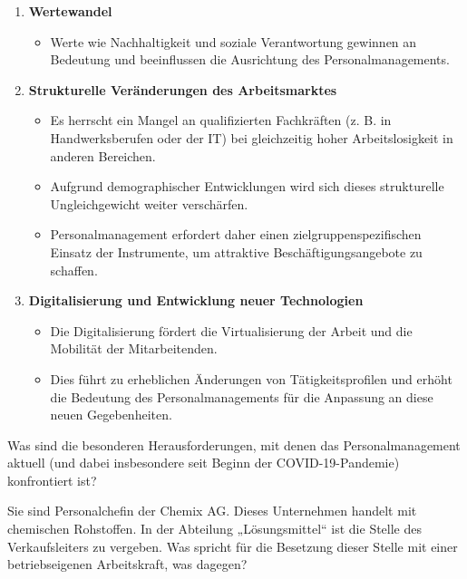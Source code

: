 {\begin{enumerate}
    \begin{itemize}
        \item Mitarbeitende legen zunehmend Wert auf individuelle Arbeitsbedingungen und maßgeschneiderte Entwicklungsmöglichkeiten.
    \end{itemize}
    \item \textbf{Wertewandel}
    \begin{itemize}
        \item Werte wie Nachhaltigkeit und soziale Verantwortung gewinnen an Bedeutung und beeinflussen die Ausrichtung des Personalmanagements.
    \end{itemize}
    \item \textbf{Strukturelle Veränderungen des Arbeitsmarktes}
    \begin{itemize}
        \item Es herrscht ein Mangel an qualifizierten Fachkräften (z. B. in Handwerksberufen oder der IT) bei gleichzeitig hoher Arbeitslosigkeit in anderen Bereichen.
        \item Aufgrund demographischer Entwicklungen wird sich dieses strukturelle Ungleichgewicht weiter verschärfen.
        \item Personalmanagement erfordert daher einen zielgruppenspezifischen Einsatz der Instrumente, um attraktive Beschäftigungsangebote zu schaffen.
    \end{itemize}
    \item \textbf{Digitalisierung und Entwicklung neuer Technologien}
    \begin{itemize}
        \item Die Digitalisierung fördert die Virtualisierung der Arbeit und die Mobilität der Mitarbeitenden.
        \item Dies führt zu erheblichen Änderungen von Tätigkeitsprofilen und erhöht die Bedeutung des Personalmanagements für die Anpassung an diese neuen Gegebenheiten.
    \end{itemize}
\end{enumerate}
}


Was sind die besonderen Herausforderungen, mit denen das Personalmanagement aktuell (und dabei insbesondere seit Beginn der COVID-19-Pandemie) konfrontiert ist?

Sie sind Personalchefin der Chemix AG. Dieses Unternehmen handelt mit chemischen Rohstoffen.  
In der Abteilung „Lösungsmittel“ ist die Stelle des Verkaufsleiters zu vergeben.  
Was spricht für die Besetzung dieser Stelle mit einer betriebseigenen Arbeitskraft, was dagegen?

